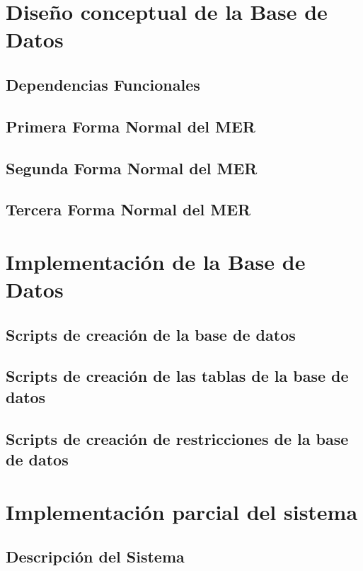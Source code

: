 \documentclass[11pt]{article}
\begin{document}
\section{Diseño conceptual de la Base de Datos}
\subsection{Dependencias Funcionales}

\subsection{Primera Forma Normal del MER}

\subsection{Segunda Forma Normal del MER}

\subsection{Tercera Forma Normal del MER}

\section{Implementación de la Base de Datos}

\subsection{Scripts de creación de la base de datos}

\subsection{Scripts de creación de las tablas de la base de datos}

\subsection{Scripts de creación de restricciones de la base de datos}

\section{Implementación parcial del sistema}
\subsection{Descripción del Sistema}
\end{document}
